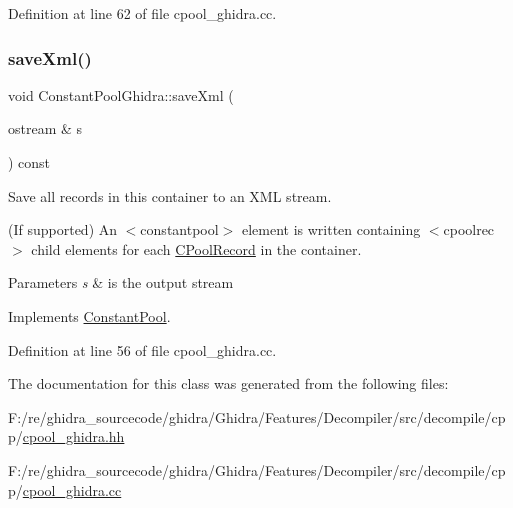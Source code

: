 Definition at line 62 of file cpool\+\_\+ghidra.\+cc.

\mbox{\label{class_constant_pool_ghidra_a9be92093e47d8158d6df6ca7c6524f80}} 
\subsubsection{\texorpdfstring{saveXml()}{saveXml()}}
{\footnotesize\ttfamily void Constant\+Pool\+Ghidra\+::save\+Xml (\begin{DoxyParamCaption}\item[{ostream \&}]{s }\end{DoxyParamCaption}) const\hspace{0.3cm}{\ttfamily [virtual]}}



Save all records in this container to an X\+ML stream. 

(If supported) An $<$constantpool$>$ element is written containing $<$cpoolrec$>$ child elements for each \mbox{\hyperlink{class_c_pool_record}{C\+Pool\+Record}} in the container. 
\begin{DoxyParams}{Parameters}
{\em s} & is the output stream \\
\hline
\end{DoxyParams}


Implements \mbox{\hyperlink{class_constant_pool_a859daeda0a7969af5462f6484905ab08}{Constant\+Pool}}.



Definition at line 56 of file cpool\+\_\+ghidra.\+cc.



The documentation for this class was generated from the following files\+:\begin{DoxyCompactItemize}
\item 
F\+:/re/ghidra\+\_\+sourcecode/ghidra/\+Ghidra/\+Features/\+Decompiler/src/decompile/cpp/\mbox{\hyperlink{cpool__ghidra_8hh}{cpool\+\_\+ghidra.\+hh}}\item 
F\+:/re/ghidra\+\_\+sourcecode/ghidra/\+Ghidra/\+Features/\+Decompiler/src/decompile/cpp/\mbox{\hyperlink{cpool__ghidra_8cc}{cpool\+\_\+ghidra.\+cc}}\end{DoxyCompactItemize}
